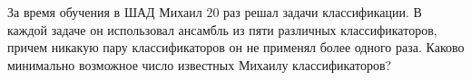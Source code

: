 \documentclass{article}
\begin{document}
За время обучения в ШАД Михаил $20$ раз решал задачи классификации. В каждой задаче он использовал ансамбль из пяти различных
классификаторов, причем никакую пару классификаторов он не применял более одного раза. Каково минимально возможное число известных Михаилу классификаторов?
\end{document}
